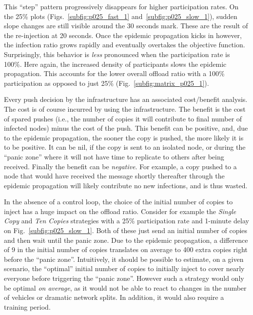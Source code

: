 \documentclass[preprint]{elsarticle}
\begin{document}
This ``step'' pattern progressively disappears for higher participation rates. On the 25\% plots (Figs.~\ref{subfig:p025_fast_1} and~\ref{subfig:p025_slow_1}), sudden slope changes are still visible around the 30 seconds mark. These are the result of the re-injection at 20 seconds. Once the epidemic propagation kicks in however, the infection ratio grows rapidly and eventually overtakes the objective function. Surprisingly, this behavior is \emph{less} pronounced when the participation rate is 100\%. Here again, the increased density of participants slows the epidemic propagation. This accounts for the lower overall offload ratio with a 100\% participation as opposed to just 25\% (Fig.~\ref{subfig:matrix_p025_1}).

Every push decision by the infrastructure has an associated cost/benefit analysis. The cost is of course incurred by using the infrastructure. The benefit is the cost of spared pushes (i.e., the number of copies it will contribute to final number of infected nodes) minus the cost of the push. This benefit can be positive, and, due to the epidemic propagation, the sooner the copy is pushed, the more likely it is to be positive. It can be nil, if the copy is sent to an isolated node, or during the ``panic zone'' where it will not have time to replicate to others after being received. Finally the benefit can be \emph{negative}. For example, a copy pushed to a node that would have received the message shortly thereafter through the epidemic propagation will likely contribute no new infections, and is thus wasted.

In the absence of a control loop, the choice of the initial number of copies to inject has a huge impact on the offload ratio. Consider for example the \textit{Single Copy} and \textit{Ten Copies} strategies with a 25\% participation rate and 1-minute delay on  Fig.~\ref{subfig:p025_slow_1}. Both of these just send an initial number of copies and then wait until the panic zone. Due to the epidemic propagation, a difference of 9 in the initial number of copies translates on average to 400 extra copies right before the ``panic zone''. Intuitively, it should be possible to estimate, on a given scenario, the ``optimal'' initial number of copies to initially inject to cover nearly everyone before triggering the ``panic zone''. However such a strategy would only be optimal \emph{on average}, as it would not be able to react to changes in the number of vehicles or dramatic network splits. In addition, it would also require a training period. 
\end{document}
